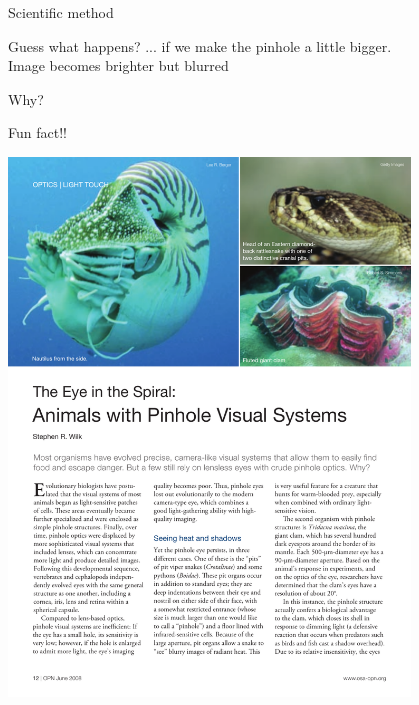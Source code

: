 \begin{frame}[fragile]{Scientific method}
  
\end{frame}

\begin{frame}{Guess what happens?}
  ... if we make the pinhole a little bigger.\\
  \pause
  {\color{red} Image becomes brighter but blurred}
\end{frame}

\begin{frame}{Why?}
  \\
  
\end{frame}

\begin{frame}{Fun fact!!}
  \begin{center}
    \includegraphics[width=0.8\textwidth, trim=0 5in 0 0,clip]{media/animalspinhole.pdf}
  \end{center}
\end{frame}
